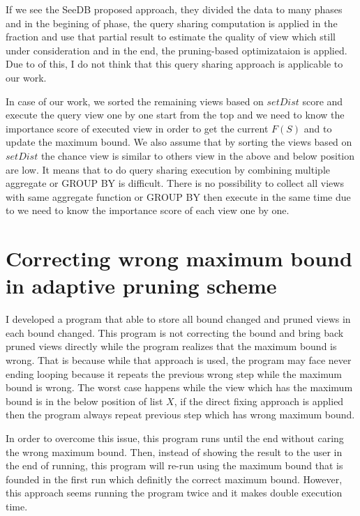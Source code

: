 \documentclass{article}
\begin{document}
If we see the SeeDB proposed approach, they divided the data to many phases and in the begining of phase, the query sharing computation is applied in the fraction and use that partial result to estimate the quality of view which still under consideration and in the end, the pruning-based optimizataion is applied. Due to of this, I do not think that this query sharing approach is applicable to our work. 

In case of our work, we sorted the remaining views based on $setDist$ score and execute the query view one by one start from the top and we need to know the importance score of executed view in order to get the current $ F(S) $ and to update the maximum bound. We also assume that by sorting the views based on $setDist$ the chance view is similar to others view in the above and below position are low. It means that to do query sharing execution by combining multiple aggregate or GROUP BY is difficult. There is no possibility to collect all views with same aggregate function or GROUP BY then execute in the same time due to we need to know the importance score of each view one by one.     

\section{Correcting wrong maximum bound in adaptive pruning scheme}
I developed a program that able to store all bound changed and pruned views in each bound changed. This program is not correcting the bound and bring back pruned views directly while the program realizes that the maximum bound is wrong. That is because while that approach is used, the program may face never ending looping because it repeats the previous wrong step while the maximum bound is wrong. The worst case happens while the view which has the maximum bound is in the below position of list $ X $, if the direct fixing approach is applied then the program always repeat previous step which has wrong maximum bound. 

In order to overcome this issue, this program runs until the end without caring the wrong maximum bound. Then, instead of showing the result to the user in the end of running, this program will re-run using the maximum bound that is founded in the first run which definitly the correct maximum bound. However, this approach seems running the program twice and it makes double execution time. 
\end{document}
